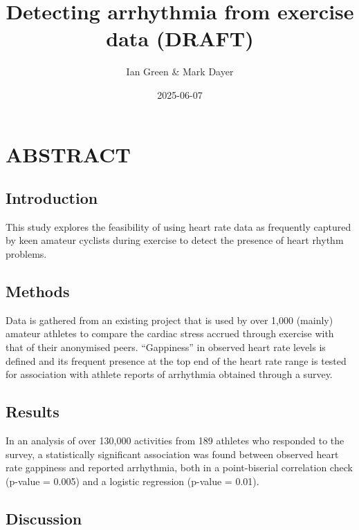 \documentclass[
  letterpaper,
  DIV=11,
  numbers=noendperiod]{scrartcl}
\title{Detecting arrhythmia from exercise data (DRAFT)}
\author{Ian Green \& Mark Dayer}
\date{2025-06-07}
\renewcommand*\contentsname{Table of contents}
\newcommand\contentsname{Table of contents}
\begin{document}
\maketitle

\renewcommand*\contentsname{Table of contents}
{
\hypersetup{linkcolor=}
\setcounter{tocdepth}{3}
\tableofcontents
}

\pagebreak

\section{ABSTRACT}\label{abstract}

\subsection{Introduction}\label{introduction}

This study explores the feasibility of using heart rate data as
frequently captured by keen amateur cyclists during exercise to detect
the presence of heart rhythm problems.

\subsection{Methods}\label{methods}

Data is gathered from an existing project that is used by over 1,000
(mainly) amateur athletes to compare the cardiac stress accrued through
exercise with that of their anonymised peers. ``Gappiness'' in observed
heart rate levels is defined and its frequent presence at the top end of
the heart rate range is tested for association with athlete reports of
arrhythmia obtained through a survey.

\subsection{Results}\label{results}

In an analysis of over 130,000 activities from 189 athletes who
responded to the survey, a statistically significant association was
found between observed heart rate gappiness and reported arrhythmia,
both in a point-biserial correlation check (p-value = 0.005) and a
logistic regression (p-value = 0.01).

\subsection{Discussion}\label{discussion}
\end{document}
